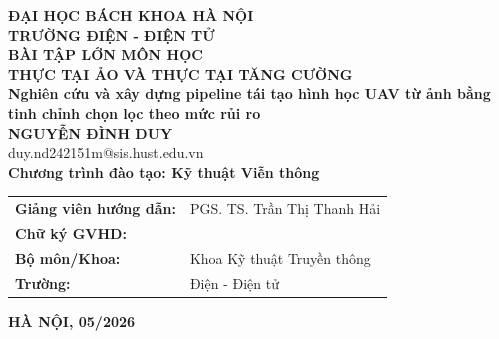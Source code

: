 \documentclass[DoAn.tex]{subfiles}
\begin{document}
\begin{titlepage}
\thispagestyle{empty}
\begin{center}

{\textbf{\large ĐẠI HỌC BÁCH KHOA HÀ NỘI}}\\[0.35cm]
{\textbf{\large TRƯỜNG ĐIỆN - ĐIỆN TỬ}}\\[3.6cm]

{\textbf{\huge BÀI TẬP LỚN MÔN HỌC}}\\[0.35cm]
{\textbf{\Large THỰC TẠI ẢO VÀ THỰC TẠI TĂNG CƯỜNG}}\\[1.0cm]
{\textbf{\Large Nghiên cứu và xây dựng pipeline tái tạo hình học UAV từ ảnh bằng tinh chỉnh chọn lọc theo mức rủi ro}}\\[1.5cm]

{\textbf{\large NGUYỄN ĐÌNH DUY}}\\
{\large duy.nd242151m@sis.hust.edu.vn}\\[0.6cm]
{\textbf{\large Chương trình đào tạo: Kỹ thuật Viễn thông}}\\[3.2cm]

\begin{table}[H]
\centering
\renewcommand{\arraystretch}{1.4}
\begin{tabular}{ll}
\textbf{Giảng viên hướng dẫn:} & PGS. TS. Trần Thị Thanh Hải \\
\textbf{Chữ ký GVHD:} & \underline{\hspace{4cm}} \\
\textbf{Bộ môn/Khoa:} & Khoa Kỹ thuật Truyền thông \\
\textbf{Trường:} & Điện - Điện tử \\
\end{tabular}
\end{table}

\vfill
{\textbf{HÀ NỘI, 05/2026}}
\end{center}
\end{titlepage}
\end{document}
